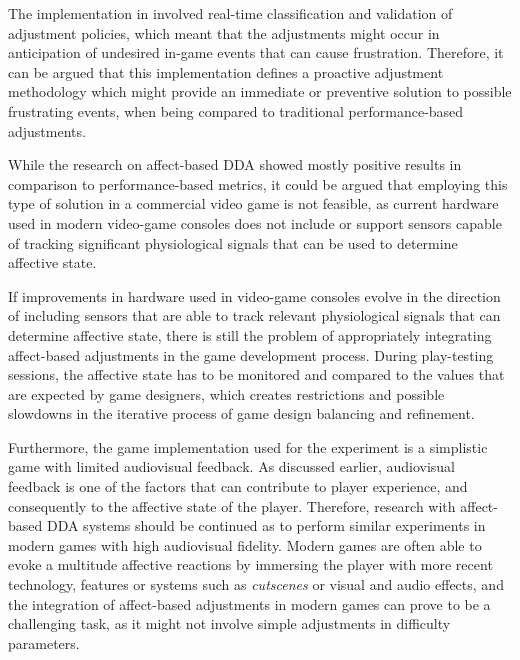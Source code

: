  The implementation in \citet{article_affectivedda} involved real-time classification and validation of adjustment policies, which meant that the adjustments might occur in anticipation of undesired in-game events that can cause frustration. Therefore, it can be argued that this implementation defines a proactive adjustment methodology which might provide an immediate or preventive solution to possible frustrating events, when being compared to traditional performance-based adjustments.


While the research on affect-based DDA showed mostly positive results in comparison to performance-based metrics, it could be argued that employing this type of solution in a commercial video game is not feasible, as current hardware used in modern video-game consoles does not include or support sensors capable of tracking significant physiological signals that can be used to determine affective state.

If improvements in hardware used in video-game consoles evolve in the direction of including sensors that are able to track relevant physiological signals that can determine affective state, there is still the problem of appropriately integrating affect-based adjustments in the game development process. During play-testing sessions, the affective state has to be monitored and compared to the values that are expected by game designers, which creates restrictions and possible slowdowns in the iterative process of game design balancing and refinement.

Furthermore, the game implementation used for the experiment is a simplistic game with limited audiovisual feedback. As discussed earlier, audiovisual feedback is one of the factors that can contribute to player experience, and consequently to the affective state of the player. Therefore, research with affect-based DDA systems should be continued as to perform similar experiments in modern games with high audiovisual fidelity. Modern games are often able to evoke a multitude affective reactions by immersing the player with more recent technology, features or systems such as \emph{cutscenes}  or visual and audio effects, and the integration of affect-based adjustments in modern games can prove to be a challenging task, as it might not involve simple adjustments in difficulty parameters.

